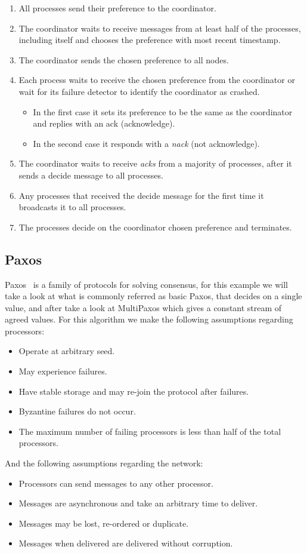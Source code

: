 \begin{enumerate}
  \item All processes send their preference to the coordinator.
  \item The coordinator waits to receive messages from at least half of the processes,
including itself and chooses the preference with most recent timestamp.
  \item The coordinator sends the chosen preference to all nodes.
  \item Each process waits to receive the chosen preference from the coordinator
or wait for its failure detector to identify the coordinator as crashed.
  \begin{itemize}
    \item In the first case it sets its preference to be the same as the coordinator
and replies with an ack (acknowledge).
    \item In the second case it responds with a \textit{nack} (not acknowledge).
  \end{itemize}
  \item The coordinator waits to receive \textit{acks} from a majority of processes, after
it sends a decide message to all processes.
  \item Any processes that received the decide message for the first time it
broadcasts it to all processes.
  \item The processes decide on the coordinator chosen preference and terminates.
\end{enumerate}

\subsection{Paxos}\label{sub:paxos}

Paxos~\cite{paxos} is a family of protocols for solving consensus, for this example we will take
a look at what is commonly referred as basic Paxos, that decides on a single value, 
and after take a look at MultiPaxos which gives a constant stream of agreed values. 
For this algorithm we make the following assumptions regarding processors:
\begin{itemize}
  \item Operate at arbitrary seed.
  \item May experience failures.
  \item Have stable storage and may re-join the protocol after failures.
  \item Byzantine failures do not occur.
  \item The maximum number of failing processors is less than half of the total processors.
\end{itemize}
And the following assumptions regarding the network:
\begin{itemize}
  \item Processors can send messages to any other processor.
  \item Messages are asynchronous and take an arbitrary time to deliver.
  \item Messages may be lost, re-ordered or duplicate.
  \item Messages when delivered are delivered without corruption.
\end{itemize}

